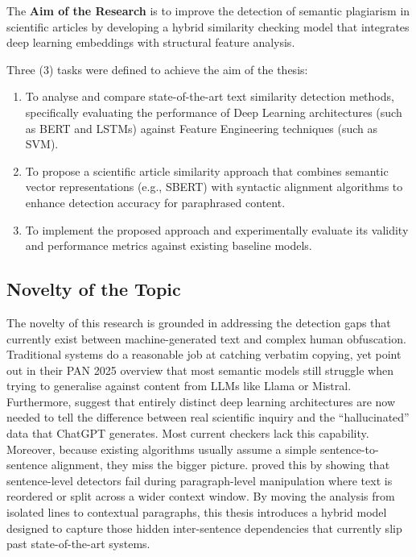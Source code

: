 \documentclass[12pt, a4paper]{article}
\begin{document}
The \textbf{Aim of the Research} is to improve the detection of semantic plagiarism in scientific articles by developing a hybrid similarity checking model that integrates deep learning embeddings with structural feature analysis.

Three (3) tasks were defined to achieve the aim of the thesis:

\begin{enumerate}
	\item To analyse and compare state-of-the-art text similarity detection methods, specifically evaluating the performance of Deep Learning architectures (such as BERT and LSTMs) against Feature Engineering techniques (such as SVM).

	\item To propose a scientific article similarity approach that combines semantic vector representations (e.g., SBERT) with syntactic alignment algorithms to enhance detection accuracy for paraphrased content.

	\item To implement the proposed approach and experimentally evaluate its validity and performance metrics against existing baseline models.
\end{enumerate}

\subsection{Novelty of the Topic}

The novelty of this research is grounded in addressing the detection gaps that currently exist between machine-generated text and complex human obfuscation. Traditional systems do a reasonable job at catching verbatim copying, yet \citet{GreinerPetter2025} point out in their PAN 2025 overview that most semantic models still struggle when trying to generalise against content from LLMs like Llama or Mistral. Furthermore, \citet{Alhijawi2025} suggest that entirely distinct deep learning architectures are now needed to tell the difference between real scientific inquiry and the ``hallucinated'' data that ChatGPT generates. Most current checkers lack this capability. Moreover, because existing algorithms usually assume a simple sentence-to-sentence alignment, they miss the bigger picture. \citet{Saqaabi2025} proved this by showing that sentence-level detectors fail during paragraph-level manipulation where text is reordered or split across a wider context window. By moving the analysis from isolated lines to contextual paragraphs, this thesis introduces a hybrid model designed to capture those hidden inter-sentence dependencies that currently slip past state-of-the-art systems.
\end{document}

